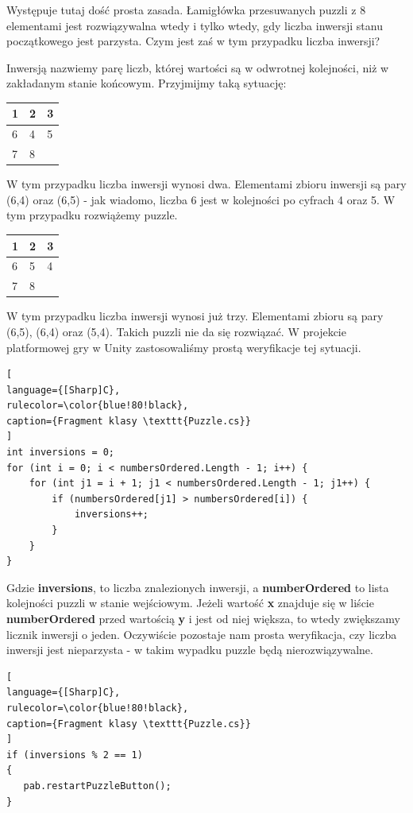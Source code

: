 \documentclass[oneside,polski,logo]{amuthesis}
\begin{document}
Występuje tutaj dość prosta zasada. Łamigłówka przesuwanych puzzli z 8 elementami jest rozwiązywalna wtedy i tylko wtedy, gdy liczba inwersji stanu początkowego jest parzysta. Czym jest zaś w tym przypadku liczba inwersji?

Inwersją nazwiemy parę liczb, której wartości są w odwrotnej kolejności, niż w zakładanym stanie końcowym. \cite{solvablePuzzle} Przyjmijmy taką sytuację:

\begin{center}
\begin{tabular}{ | m{5em} | m{1cm}| m{1cm} | } 
\hline
 1 & 2 & 3 \\ 
\hline
 6 & 4 & 5 \\
\hline  
 7 & 8 &     \\
\hline
\end{tabular}
\end{center}

W tym przypadku liczba inwersji wynosi dwa. Elementami zbioru inwersji są pary (6,4) oraz (6,5) - jak wiadomo, liczba 6 jest w kolejności po cyfrach 4 oraz 5. W tym przypadku rozwiążemy puzzle.

\begin{center}
\begin{tabular}{ | m{5em} | m{1cm}| m{1cm} | } 
\hline
 1 & 2 & 3 \\ 
\hline
 6 & 5 & 4 \\  
\hline
 7 & 8 &     \\
\hline
\end{tabular}
\end{center}

W tym przypadku liczba inwersji wynosi już trzy. Elementami zbioru są pary (6,5), (6,4) oraz (5,4). Takich puzzli nie da się rozwiązać. 
W projekcie platformowej gry w Unity zastosowaliśmy prostą weryfikacje tej sytuacji. 

\begin{lstlisting}[
language={[Sharp]C},
rulecolor=\color{blue!80!black},
caption={Fragment klasy \texttt{Puzzle.cs}}
]
int inversions = 0;
for (int i = 0; i < numbersOrdered.Length - 1; i++) {
    for (int j1 = i + 1; j1 < numbersOrdered.Length - 1; j1++) {
        if (numbersOrdered[j1] > numbersOrdered[i]) {
            inversions++;
        }
    }
}

\end{lstlisting}
\par Gdzie \textbf{inversions}, to liczba znalezionych inwersji, a \textbf{numberOrdered} to lista kolejności puzzli w stanie wejściowym. Jeżeli wartość \textbf{x} znajduje się w liście \textbf{numberOrdered} przed wartością \textbf{y} i jest od niej większa, to wtedy zwiększamy licznik inwersji o jeden.
Oczywiście pozostaje nam prosta weryfikacja, czy liczba inwersji jest nieparzysta - w takim wypadku puzzle będą nierozwiązywalne.
\begin{lstlisting}[
language={[Sharp]C},
rulecolor=\color{blue!80!black},
caption={Fragment klasy \texttt{Puzzle.cs}}
]
if (inversions % 2 == 1)
{
   pab.restartPuzzleButton();
}
\end{lstlisting}
\end{document}

